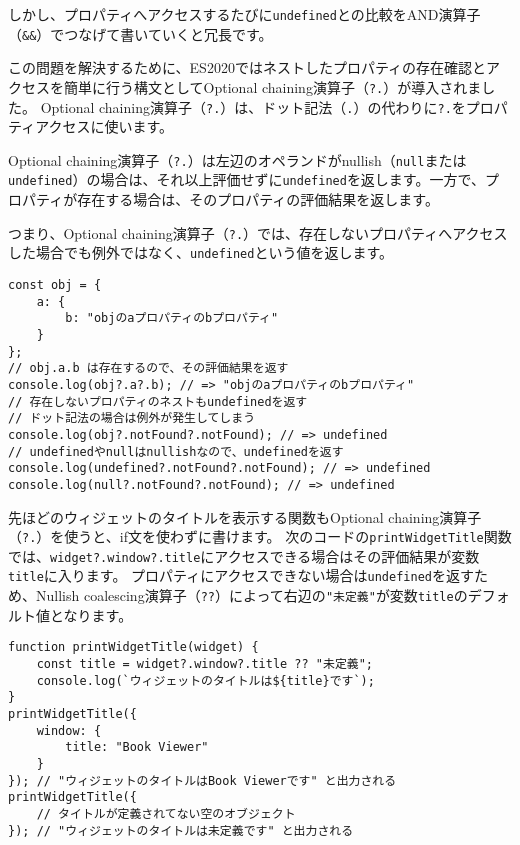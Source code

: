 しかし、プロパティへアクセスするたびに\texttt{undefined}との比較をAND演算子（\texttt{\&\&}）でつなげて書いていくと冗長です。

この問題を解決するために、ES2020ではネストしたプロパティの存在確認とアクセスを簡単に行う構文としてOptional chaining演算子（\texttt{?.}）が導入されました。
Optional chaining演算子（\texttt{?.}）は、ドット記法（\texttt{.}）の代わりに\texttt{?.}をプロパティアクセスに使います。

Optional chaining演算子（\texttt{?.}）は左辺のオペランドがnullish（\texttt{null}または\texttt{undefined}）の場合は、それ以上評価せずに\texttt{undefined}を返します。一方で、プロパティが存在する場合は、そのプロパティの評価結果を返します。

つまり、Optional chaining演算子（\texttt{?.}）では、存在しないプロパティへアクセスした場合でも例外ではなく、\texttt{undefined}という値を返します。

\begin{lstlisting}
const obj = {
    a: {
        b: "objのaプロパティのbプロパティ"
    }
};
// obj.a.b は存在するので、その評価結果を返す
console.log(obj?.a?.b); // => "objのaプロパティのbプロパティ"
// 存在しないプロパティのネストもundefinedを返す
// ドット記法の場合は例外が発生してしまう
console.log(obj?.notFound?.notFound); // => undefined
// undefinedやnullはnullishなので、undefinedを返す
console.log(undefined?.notFound?.notFound); // => undefined
console.log(null?.notFound?.notFound); // => undefined
\end{lstlisting}

先ほどのウィジェットのタイトルを表示する関数もOptional chaining演算子（\texttt{?.}）を使うと、if文を使わずに書けます。
次のコードの\texttt{printWidgetTitle}関数では、\texttt{widget?.window?.title}にアクセスできる場合はその評価結果が変数\texttt{title}に入ります。
プロパティにアクセスできない場合は\texttt{undefined}を返すため、Nullish coalescing演算子（\texttt{??}）によって右辺の\texttt{"未定義"}が変数\texttt{title}のデフォルト値となります。

\begin{lstlisting}
function printWidgetTitle(widget) {
    const title = widget?.window?.title ?? "未定義";
    console.log(`ウィジェットのタイトルは${title}です`);
}
printWidgetTitle({
    window: {
        title: "Book Viewer"
    }
}); // "ウィジェットのタイトルはBook Viewerです" と出力される
printWidgetTitle({
    // タイトルが定義されてない空のオブジェクト
}); // "ウィジェットのタイトルは未定義です" と出力される
\end{lstlisting}

